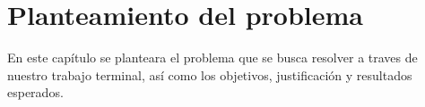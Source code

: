 \chapter{Planteamiento del problema}
En este capítulo se planteara el problema que se busca resolver a traves de nuestro trabajo terminal, así como los objetivos, justificación y resultados esperados.